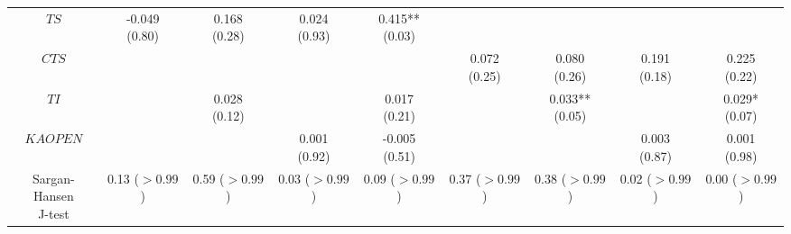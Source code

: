 \begin{tabular}{ccccccccc}
                                          $TS$ &          \makecell{-0.049\\(0.80)} &           \makecell{0.168\\(0.28)} &           \makecell{0.024\\(0.93)} &         \makecell{0.415**\\(0.03)} &                                    &                                    &                                    &                                    \\
                                         $CTS$ &                                    &                                    &                                    &                                    &           \makecell{0.072\\(0.25)} &           \makecell{0.080\\(0.26)} &           \makecell{0.191\\(0.18)} &           \makecell{0.225\\(0.22)} \\
                                          $TI$ &                                    &           \makecell{0.028\\(0.12)} &                                    &           \makecell{0.017\\(0.21)} &                                    &         \makecell{0.033**\\(0.05)} &                                    &          \makecell{0.029*\\(0.07)} \\
                                      $KAOPEN$ &                                    &                                    &           \makecell{0.001\\(0.92)} &          \makecell{-0.005\\(0.51)} &                                    &                                    &           \makecell{0.003\\(0.87)} &           \makecell{0.001\\(0.98)} \\
              \makecell{Sargan-Hansen\\J-test} &        \makecell{0.13\\($> 0.99$)} &        \makecell{0.59\\($> 0.99$)} &        \makecell{0.03\\($> 0.99$)} &        \makecell{0.09\\($> 0.99$)} &        \makecell{0.37\\($> 0.99$)} &        \makecell{0.38\\($> 0.99$)} &        \makecell{0.02\\($> 0.99$)} &        \makecell{0.00\\($> 0.99$)} \\

\end{tabular}
